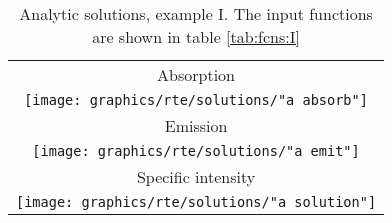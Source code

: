 \begin{table}[htbp]
\caption[Analytic solutions, example I]{Analytic solutions, example I. The input functions are shown in table \eqref{tab:fcns:I}}
\begin{center}
\begin{tabular}{c}
%
Absorption \\
\texttt{[image: graphics/rte/solutions/"a absorb"]} \\[10pt]
%
Emission \\
\texttt{[image: graphics/rte/solutions/"a emit"]} \\[10pt]
%
Specific intensity \\
\texttt{[image: graphics/rte/solutions/"a solution"]} \\
%
%
\end{tabular}
\end{center}
\label{rte:solutions I}
\end{table}%


\endinput %